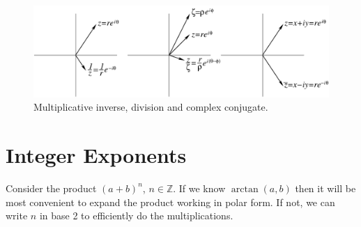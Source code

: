 \begin{figure}[h!]
  \begin{center}
      \includegraphics[width=\textwidth]{fcv/number/inv_div_conj}
  \end{center}
  \caption{Multiplicative inverse, division and complex conjugate.}
  \label{inv_div_conj}
\end{figure}

















\section{Integer Exponents}





Consider the product $(a + b)^n$, $n \in \mathbb{Z}$.  
If we know $\arctan(a,b)$ then 
it will be most convenient to expand the product working in polar form.  
If not, we can write $n$ in base 2 to efficiently do the multiplications.





